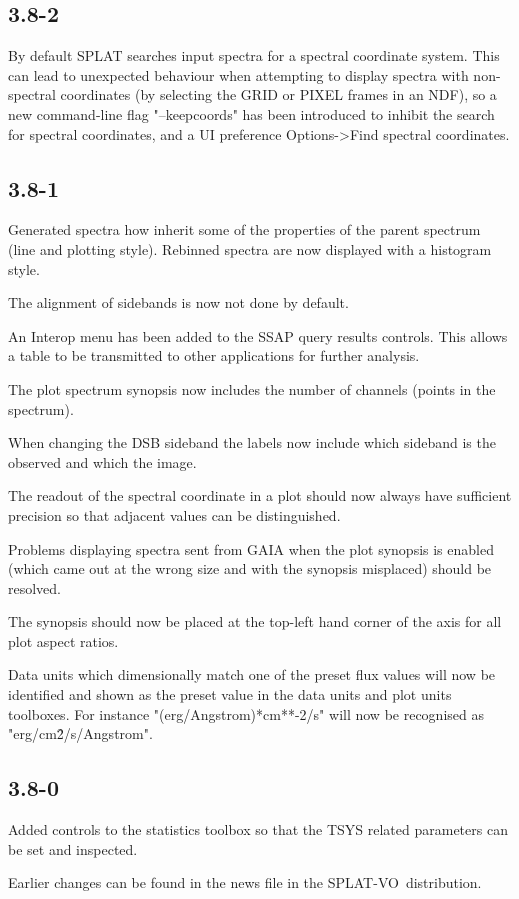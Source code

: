 \documentclass[twoside,11pt]{article}
\renewcommand{\_}{\texttt{\symbol{95}}}
\newcommand{\SPLAT}{\textsf{SPLAT-VO}}
\begin{document}
\subsection{3.8-2}

By default SPLAT searches input spectra for a spectral coordinate system.
This can lead to unexpected behaviour when attempting to display spectra with
non-spectral coordinates (by selecting the GRID or PIXEL frames in an NDF), so
a new command-line flag "--keepcoords" has been introduced to inhibit the
search for spectral coordinates, and a UI preference Options->Find spectral
coordinates.

\subsection{3.8-1}

Generated spectra how inherit some of the properties of the parent spectrum
(line and plotting style).  Rebinned spectra are now displayed with a
histogram style.

The alignment of sidebands is now not done by default.

An Interop menu has been added to the SSAP query results controls.  This
allows a table to be transmitted to other applications for further analysis.

The plot spectrum synopsis now includes the number of channels (points in the
spectrum).

When changing the DSB sideband the labels now include which sideband is the
observed and which the image.

The readout of the spectral coordinate in a plot should now always have
sufficient precision so that adjacent values can be distinguished.

Problems displaying spectra sent from GAIA when the plot synopsis is enabled
(which came out at the wrong size and with the synopsis misplaced) should be
resolved.

The synopsis should now be placed at the top-left hand corner of the axis for
all plot aspect ratios.

Data units which dimensionally match one of the preset flux values will now be
identified and shown as the preset value in the data units and plot units
toolboxes. For instance "(erg/Angstrom)*cm**-2/s" will now be recognised as
"erg/cm\^2/s/Angstrom".

\subsection{3.8-0}

Added controls to the statistics toolbox so that the TSYS related
parameters can be set and inspected.

Earlier changes can be found in the news file in the \SPLAT\ distribution.
\end{document}
